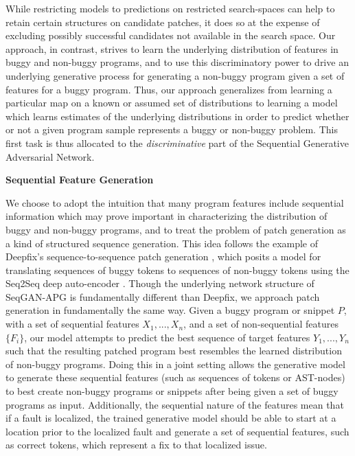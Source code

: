 \documentclass[sigconf]{acmart}
\begin{document}
While restricting models to predictions on restricted search-spaces can help to retain certain structures on candidate patches, it does so at the expense of excluding possibly successful candidates not available in the search space. Our approach, in contrast, strives to learn the underlying distribution of features in buggy and non-buggy programs, and to use this discriminatory power to drive an underlying generative process for generating a non-buggy program given a set of features for a buggy program.  Thus, our approach generalizes from learning a particular map on a known or assumed set of distributions to learning a model which learns estimates of the underlying distributions in order to predict whether or not a given program sample represents a buggy or non-buggy problem. This first task is thus allocated to the \textit{discriminative} part of the Sequential Generative Adversarial Network.

\textbf{Sequential Feature Generation}

We choose to adopt the intuition that many program features include sequential information which may prove important in characterizing the distribution of buggy and non-buggy programs, and to treat the problem of patch generation as a kind of structured sequence generation. This idea follows the example of Deepfix's sequence-to-sequence patch generation \cite{gupta2017deepfix}, which posits a model for translating sequences of buggy tokens to sequences of non-buggy tokens using the Seq2Seq deep auto-encoder \cite{luong2015seq2seq}. Though the underlying network structure of SeqGAN-APG is fundamentally different than Deepfix, we approach patch generation in fundamentally the same way. Given a buggy program or snippet $P$, with a set of sequential features $X_1, ..., X_n$, and a set of non-sequential features $\{F_i\}$, our model attempts to predict the best sequence of target features $Y_1, ..., Y_n$ such that the resulting patched program best resembles the learned distribution of non-buggy programs. Doing this in a joint setting allows the generative model to generate these sequential features (such as sequences of tokens or AST-nodes) to best create non-buggy programs or snippets after being given a set of buggy programs as input. Additionally, the sequential nature of the features mean that if a fault is localized, the trained generative model should be able to start at a location prior to the localized fault and generate a set of sequential features, such as correct tokens, which represent a fix to that localized issue.
\end{document}
